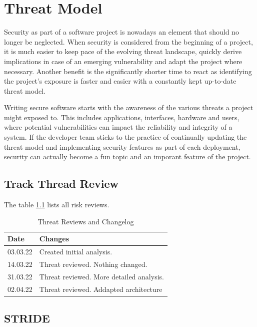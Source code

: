 \chapter{Threat Model}

Security as part of a software project is nowadays an element that should no longer be neglected. When security is considered from the beginning of a project, it is much easier to keep pace of the evolving threat landscape, quickly derive implications in case of an emerging vulnerability and adapt the project where necessary. Another benefit is the significantly shorter time to react as identifying the project's exposure is faster and easier with a constantly kept up-to-date threat model.

Writing secure software starts with the awareness of the various threats a project might exposed to. This includes applications, interfaces, hardware and users, where potential vulnerabilities can impact the reliability and integrity of a system. If the developer team sticks to the practice of continually updating the threat model and implementing security features as part of each deployment, security can actually become a fun topic and an imporant feature of the project.

\section{Track Thread Review}
The table \ref{tab:threat-review} lists all risk reviews.

\begin{table}[h!]
  \centering
  \caption{\label{tab:threat-review}Threat Reviews and Changelog}
  \begin{tabular}{ | l | l | }
    \hline
    \textbf{Date} & \textbf{Changes} \\
    \hline
    03.03.22 & Created initial analysis. \\
    \hline
    14.03.22 & Threat reviewed. Nothing changed. \\
    \hline
    31.03.22 & Threat reviewed. More detailed analysis. \\
    \hline
    02.04.22 & Threat reviewed. Addapted architecture \\
    \hline
  \end{tabular}
\end{table}

\section{STRIDE}

